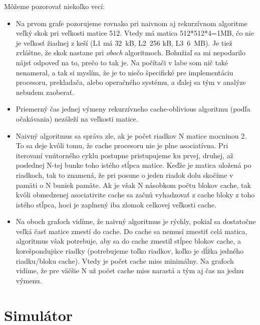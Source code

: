 \documentclass[12pt,a4paper]{article}
\begin{document}
Môžeme pozorovať niekoľko vecí:
\begin{itemize}
	\item Na prvom grafe pozorujeme rovnako pri naivnom aj rekurzívnom algoritme veľký skok pri veľkosti matice 512. Vtedy má matica 512*512*4=1MB, čo nie je veľkosť žiadnej z keší (L1 má 32~kB, L2~256 kB, L3~6~MB). Je tiež zvláštne, že skok nastane pri \emph{oboch} algoritmoch. Bohužiaľ sa mi nepodarilo nájsť odpoveď na to, prečo to tak je. Na počítači v labe som nič také nenameral, a tak si myslím, že je to niečo špecifické pre implementáciu procesoru, prekladača, alebo operačného systému, a ďalej sa tým v analýze nebudem zaoberať.
	\item Priemerný čas jednej výmeny rekurzívneho cache-oblivious algoritmu (podľa očakávania) nezáleží na veľkosti matice.
	\item Naivný algoritmus sa správa zle, ak je počet riadkov N matice mocninou 2. To sa deje kvôli tomu, že cache procesoru nie je plne asociatívna. Pri iterovaní vnútorného cyklu postupne pristupujeme ku prvej, druhej, až poslednej N-tej bunke toho istého stĺpca matice. Keďže je matica uložená po riadkoch, tak to znamená, že pri posune o jeden riadok dolu skočíme v pamäti o N buniek pamäte. Ak je však N násobkom počtu blokov cache, tak kvôli obmedzenej asociativite cache sa začnú vyhadzovať z cache bloky z toho istého stĺpca, hoci je zaplnený iba zlomok celkovej veľkosti cache.
	\item Na oboch grafoch vidíme, že naivný algoritmus je rýchly, pokiaľ sa dostatočne veľká časť matice zmestí do cache. Do cache sa nemusí zmestiť celá matica, algoritmus však potrebuje, aby sa do cache zmestil stĺpec blokov cache, a korešpondujúce riadky (potrebujeme toľko riadkov, koľko je dĺžka jedného riadku/bloku cache). Vtedy je počet cache miss minimálny. Na grafoch vidíme, že pre väčšie N už počet cache miss narastá a tým aj čas na jednu výmenu.
\end{itemize}

\section{Simulátor}
\end{document}
